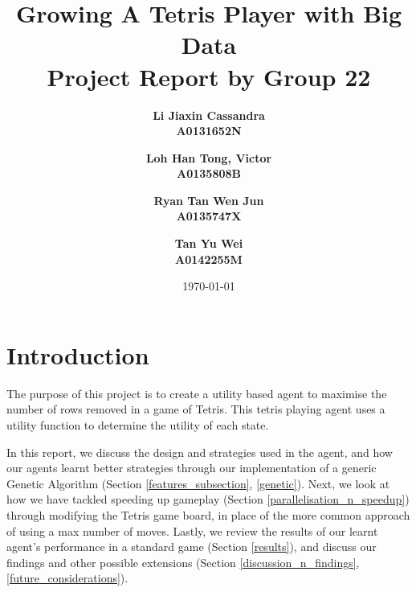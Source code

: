 \documentclass[a4paper,12pt,twocolumn]{article}
\begin{document}

\title{
    Growing A Tetris Player with Big Data\\
    \large Project Report by Group 22
}
\author{
    \bf{Li Jiaxin Cassandra}\\ 
    A0131652N
    \and
    \bf{Loh Han Tong, Victor}\\
    A0135808B
    \and
    \bf{Ryan Tan Wen Jun}\\
    A0135747X
    \and
    \bf{Tan Yu Wei}\\
    A0142255M
}
\date{\today}
\maketitle

\section{Introduction}
The purpose of this project is to create a utility based agent to maximise the
number of rows removed in a game of Tetris. This tetris playing agent uses a utility
function to determine the utility of each state.


In this report, we discuss the design and strategies used in the agent, and how our
agents learnt better strategies through our implementation of a generic Genetic
Algorithm (Section \ref{features_subsection}, \ref{genetic}).
Next, we look at how we have tackled speeding up gameplay (Section \ref{parallelisation_n_speedup}) through
modifying the Tetris game board, in place of the more common approach of using a
max number of moves. 
Lastly, we review the results of our learnt agent's performance in a standard game (Section \ref{results}),
and discuss our findings and other possible extensions (Section \ref{discussion_n_findings}, \ref{future_considerations}).

\end{document}
